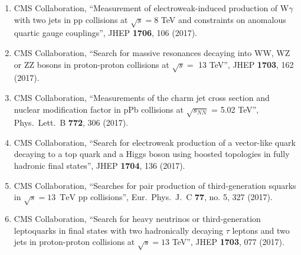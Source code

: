\begin{itemize}
\begin{enumerate}
\item CMS Collaboration, ``Measurement of electroweak-induced production of W$\gamma$ with two jets in pp collisions at $ \sqrt{s}=8 $ TeV and constraints on anomalous quartic gauge couplings'', JHEP {\bf 1706}, 106 (2017).

\item CMS Collaboration, ``Search for massive resonances decaying into WW, WZ or ZZ bosons in proton-proton collisions at $\sqrt{s} = $ 13 TeV'', JHEP {\bf 1703}, 162 (2017).

\item CMS Collaboration, ``Measurements of the charm jet cross section and nuclear modification factor in pPb collisions at $\sqrt{{s}_{NN}}$ = 5.02 TeV'', Phys.\ Lett.\ B {\bf 772}, 306 (2017).

\item CMS Collaboration, ``Search for electroweak production of a vector-like quark decaying to a top quark and a Higgs boson using boosted topologies in fully hadronic final states'', JHEP {\bf 1704}, 136 (2017).

\item CMS Collaboration, ``Searches for pair production of third-generation squarks in $\sqrt{s}=13$ $\,\text {TeV}$ pp collisions'', Eur.\ Phys.\ J.\ C {\bf 77}, no. 5, 327 (2017).

\item CMS Collaboration, ``Search for heavy neutrinos or third-generation leptoquarks in final states with two hadronically decaying $\tau$ leptons and two jets in proton-proton collisions at $ \sqrt{s}=13 $ TeV'', JHEP {\bf 1703}, 077 (2017).


\end{enumerate}
\end{itemize}
